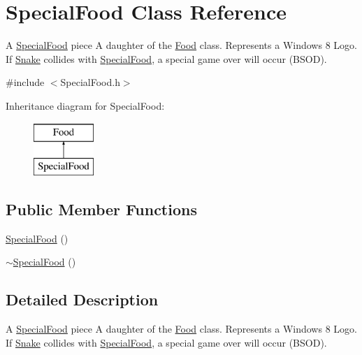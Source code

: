 \hypertarget{classSpecialFood}{\section{\-Special\-Food \-Class \-Reference}
\label{classSpecialFood}
}


\-A \hyperlink{classSpecialFood}{\-Special\-Food} piece \-A daughter of the \hyperlink{classFood}{\-Food} class. \-Represents a \-Windows 8 \-Logo. \-If \hyperlink{classSnake}{\-Snake} collides with \hyperlink{classSpecialFood}{\-Special\-Food}, a special game over will occur (\-B\-S\-O\-D).  




{\ttfamily \#include $<$\-Special\-Food.\-h$>$}

\-Inheritance diagram for \-Special\-Food\-:\begin{figure}[H]
\begin{center}
\leavevmode
\includegraphics[height=2.000000cm]{classSpecialFood}
\end{center}
\end{figure}
\subsection*{\-Public \-Member \-Functions}
\begin{DoxyCompactItemize}
\item 
\hyperlink{classSpecialFood_af5257634148eee6b3b5f78b176f50a69}{\-Special\-Food} ()
\item 
\hyperlink{classSpecialFood_a189948b86e53cd790d1ed7be5f9325b9}{$\sim$\-Special\-Food} ()
\end{DoxyCompactItemize}


\subsection{\-Detailed \-Description}
\-A \hyperlink{classSpecialFood}{\-Special\-Food} piece \-A daughter of the \hyperlink{classFood}{\-Food} class. \-Represents a \-Windows 8 \-Logo. \-If \hyperlink{classSnake}{\-Snake} collides with \hyperlink{classSpecialFood}{\-Special\-Food}, a special game over will occur (\-B\-S\-O\-D). 

